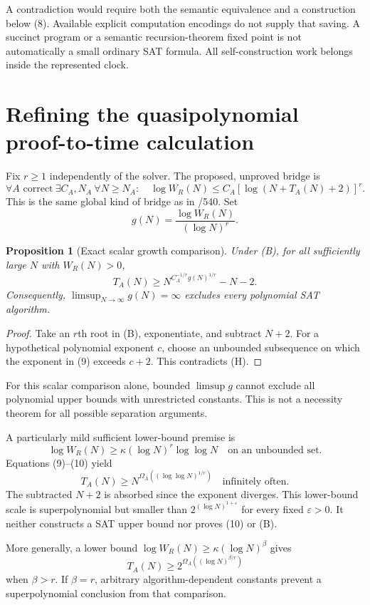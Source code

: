 \documentclass[11pt]{article}
\newtheorem{proposition}{Proposition}
\begin{document}
A contradiction would require both the semantic equivalence and a
construction below (8). Available explicit computation encodings do not
supply that saving. A succinct program or a semantic recursion-theorem
fixed point is not automatically a small ordinary SAT formula.
All self-construction work belongs inside the represented clock.

\section{Refining the quasipolynomial proof-to-time calculation}
Fix $r\ge1$ independently of the solver. The proposed, unproved bridge is
\[
 \forall A\text{ correct}\ \exists C_A,N_A\
 \forall N\ge N_A:\quad
 \log W_R(N)\le
 C_A[\log(N+T_A(N)+2)]^r.
 \tag{B}
\]
This is the same global kind of bridge as in /540. Set
\[
 g(N)=\frac{\log W_R(N)}{(\log N)^r}.
\]
\begin{proposition}[Exact scalar growth comparison]
Under (B), for all sufficiently large $N$ with $W_R(N)>0$,
\[
 T_A(N)\ge N^{C_A^{-1/r}g(N)^{1/r}}-N-2.
 \tag{9}
\]
Consequently, $\limsup_{N\to\infty}g(N)=\infty$ excludes every polynomial
SAT algorithm.
\end{proposition}
\begin{proof}
Take an $r$th root in (B), exponentiate, and subtract $N+2$.
For a hypothetical polynomial exponent $c$, choose an unbounded subsequence
on which the exponent in (9) exceeds $c+2$. This contradicts (H).
\end{proof}

For this scalar comparison alone, bounded $\limsup g$ cannot exclude all
polynomial upper bounds with unrestricted constants. This is not a
necessity theorem for all possible separation arguments.

A particularly mild sufficient lower-bound premise is
\[
 \log W_R(N)\ge
 \kappa(\log N)^r\log\log N
 \quad\text{on an unbounded set}.
 \tag{10}
\]
Equations (9)--(10) yield
\[
 T_A(N)\ge
 N^{\Omega_A((\log\log N)^{1/r})}
 \quad\text{infinitely often}.
 \tag{11}
\]
The subtracted $N+2$ is absorbed since the exponent diverges.
This lower-bound scale is superpolynomial but smaller than
$2^{(\log N)^{1+\varepsilon}}$ for every fixed $\varepsilon>0$.
It neither constructs a SAT upper bound nor proves (10) or (B).

More generally, a lower bound
$\log W_R(N)\ge\kappa(\log N)^\beta$ gives
\[
 T_A(N)\ge 2^{\Omega_A((\log N)^{\beta/r})}
\]
when $\beta>r$. If $\beta=r$, arbitrary algorithm-dependent constants
prevent a superpolynomial conclusion from that comparison.
\end{document}
